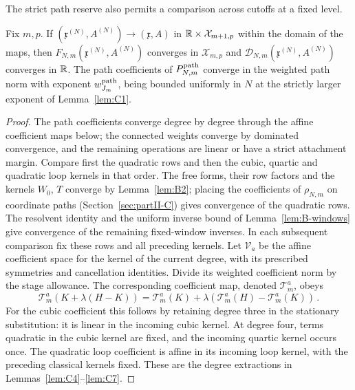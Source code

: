 The strict path reserve also permits a comparison across cutoffs at a fixed level.
\begin{lemma}\label{lem:D-cutoff-continuity}
Fix $m,p$. If $(\mathfrak x^{(N)},A^{(N)})\to(\mathfrak x,A)$ in $\mathbb{R}\times\mathcal X_{m+1,p}$ within the domain of the maps, then $F_{N,m}(\mathfrak x^{(N)},A^{(N)})$ converges in $\mathcal X_{m,p}$ and $\mathcal D_{N,m}(\mathfrak x^{(N)},A^{(N)})$ converges in $\mathbb{R}$. The path coefficients of $P^{\mathrm{path}}_{N,m}$ converge in the weighted path norm with exponent $w^{\rm path}_{J_m}$, being bounded uniformly in $N$ at the strictly larger exponent of Lemma~\ref{lem:C1}.
\end{lemma}
\begin{proof}
The path coefficients converge degree by degree through the affine coefficient maps below; the connected weights converge by dominated convergence, and the remaining operations are linear or have a strict attachment margin. Compare first the quadratic rows and then the cubic, quartic and quadratic loop kernels in that order. The free forms, their row factors and the kernels $W_0$, $T$ converge by Lemma~\ref{lem:B2}; placing the coefficients of $\rho_{N,m}$ on coordinate paths (Section~\ref{sec:partII-C}) gives convergence of the quadratic rows. The resolvent identity and the uniform inverse bound of Lemma~\ref{lem:B-windows} give convergence of the remaining fixed-window inverses. In each subsequent comparison fix these rows and all preceding kernels. Let $\mathcal V_a$ be the affine coefficient space for the kernel of the current degree, with its prescribed symmetries and cancellation identities. Divide its weighted coefficient norm by the stage allowance. The corresponding coefficient map, denoted $\mathcal T_m^a$, obeys
\begin{equation}\label{eq:D-affine-kernel}
\mathcal T_m^a(K+\lambda(H-K))
=\mathcal T_m^a(K)+\lambda(\mathcal T_m^a(H)-\mathcal T_m^a(K))\,.
\end{equation}
For the cubic coefficient this follows by retaining degree three in the stationary substitution: it is linear in the incoming cubic kernel. At degree four, terms quadratic in the cubic kernel are fixed, and the incoming quartic kernel occurs once. The quadratic loop coefficient is affine in its incoming loop kernel, with the preceding classical kernels fixed. These are the degree extractions in Lemmas~\ref{lem:C4}--\ref{lem:C7}.


\end{proof}
